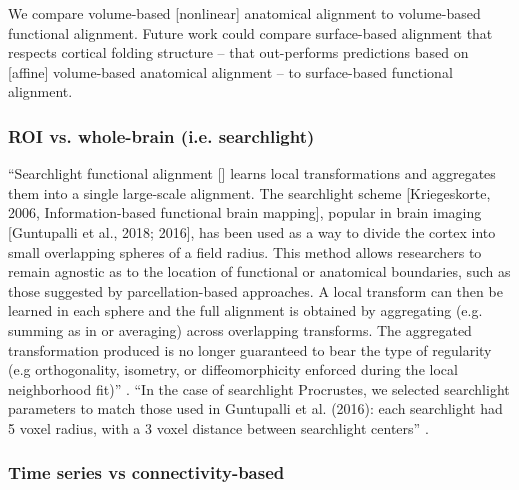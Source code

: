 We compare volume-based [nonlinear] anatomical alignment to volume-based
functional alignment.
%
Future work could compare surface-based alignment that respects cortical folding
structure -- that out-performs predictions based on [affine] volume-based
anatomical alignment \citep{weiner2018defining} -- to surface-based functional
alignment.



\subsubsection{ROI vs. whole-brain (i.e. searchlight)}




``Searchlight functional alignment [\citep{zhang2016searchlight,
guntupalli2016model}] learns local transformations and aggregates them into a
single large-scale alignment.
%
The searchlight scheme [Kriegeskorte, 2006, Information-based functional brain
mapping], popular in brain imaging [Guntupalli et al., 2018; 2016], has been
used as a way to divide the cortex into small overlapping spheres of a field
radius.
%
This method allows researchers to remain agnostic as to the location of
functional or anatomical boundaries, such as those suggested by
parcellation-based approaches.
%
A local transform can then be learned in each sphere and the full alignment is
obtained by aggregating (e.g. summing as in \citep{guntupalli2016model} or
averaging) across overlapping transforms.
%
The aggregated transformation produced is no longer guaranteed to bear the type
of regularity (e.g orthogonality, isometry, or diffeomorphicity enforced during
the local neighborhood fit)'' \citep{bazeille2021empirical}.
%
``In the case of searchlight Procrustes, we selected searchlight parameters to
match those used in Guntupalli et al. (2016):
%
each searchlight had 5 voxel radius, with a 3 voxel distance between searchlight
centers'' \citep{bazeille2021empirical}.


\subsubsection{Time series vs connectivity-based}





